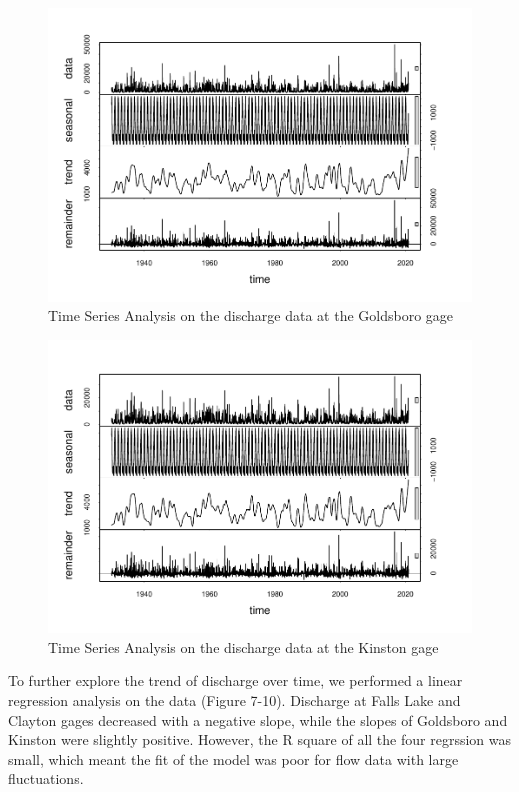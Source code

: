 \documentclass[
  12pt,
]{article}
\begin{document}
\begin{figure}

\includegraphics{Gardner_Zeng_pdf_output_files/figure-latex/Time series Goldsboro-1} \hfill{}

\caption{Time Series Analysis on the discharge data at the Goldsboro gage}\label{fig:Time series Goldsboro}
\end{figure}

\begin{figure}

\includegraphics{Gardner_Zeng_pdf_output_files/figure-latex/Time series Kinston-1} \hfill{}

\caption{Time Series Analysis on the discharge data at the Kinston gage}\label{fig:Time series Kinston}
\end{figure}

To further explore the trend of discharge over time, we performed a
linear regression analysis on the data (Figure 7-10). Discharge at Falls
Lake and Clayton gages decreased with a negative slope, while the slopes
of Goldsboro and Kinston were slightly positive. However, the R square
of all the four regrssion was small, which meant the fit of the model
was poor for flow data with large fluctuations.
\end{document}
